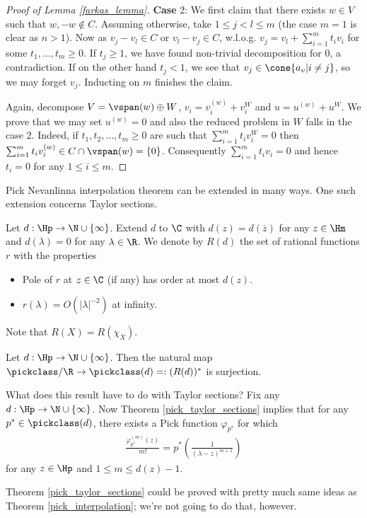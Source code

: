 \begin{proof}[Proof of Lemma \ref{farkas_lemma}]
	\textbf{Case} 2: We first claim that there exists $w \in V$ such that $w, -w \notin C$. Assuming otherwise, take $1 \leq j < l \leq m$ (the case $m = 1$ is clear as $n > 1$). Now as $v_{j} - v_{l} \in C$ or $v_{l} - v_{j} \in C$, w.l.o.g. $v_{j} = v_{l} + \sum_{i = 1}^{m} t_{i} v_{i}$ for some $t_{1}, \ldots, t_{m} \geq 0$. If $t_{j} \geq 1$, we have found non-trivial decomposition for $0$, a contradiction. If on the other hand $t_{j} < 1$, we see that $v_{j} \in \cone\{a_{v} | i \neq j\}$, so we may forget $v_{j}$. Inducting on $m$ finishes the claim.

	Again, decompose $V = \vspan(w) \oplus W$, $v_{i} = v_{i}^{(w)} + v_{i}^{W}$ and $u = u^{(w)} + u^{W}$. We prove that we may set $u^{(w)} = 0$ and also the reduced problem in $W$ falls in the case 2. Indeed, if $t_{1}, t_{2}, \ldots, t_{m} \geq 0$ are such that $\sum_{i = 1}^{m} t_{i} v_{i}^{W} = 0$ then $\sum_{i = 1}^{m} t_{i} v_{i}^{(w)} \in C \cap \vspan(w) = \{0\}$. Consequently $\sum_{i = 1}^{m} t_{i} v_{i} = 0$ and hence $t_{i} = 0$ for any $1 \leq i \leq m$.
\end{proof}

\begin{huom}\label{taylor_section_rem}
	Pick Nevanlinna interpolation theorem can be extended in many ways. One such extension concerns Taylor sections.
	\begin{maar}
		Let $d : \Hp \to \N \cup \{\infty\}$. Extend $d$ to $\C$ with $d(z) = d(\overline{z})$ for any $z \in \Hm$ and $d(\lambda) = 0$ for any $\lambda \in \R$. We denote by $R(d)$ the set of rational functions $r$ with the properties
		\begin{itemize}
			\item Pole of $r$ at $z \in \C$ (if any) has order at most $d(z)$.
			\item $r(\lambda) = O(|\lambda|^{-2})$ at infinity.
		\end{itemize}
	\end{maar}
	Note that $R(X) = R(\chi_{X})$.
	\begin{lause}\label{pick_taylor_sections}
		Let $d : \Hp \to \N \cup \{\infty\}$. Then the natural map $\pickclass/\R \to \pickclass(d) =: (R(d))^{*}$ is surjection.
	\end{lause}
	What does this result have to do with Taylor sections? Fix any $d : \Hp \to \N \cup \{\infty\}$. Now Theorem \ref{pick_taylor_sections} implies that for any $p^{*} \in \pickclass(d)$, there exists a Pick function $\varphi_{p^{*}}$ for which
	\begin{align*}
		\frac{\varphi_{p^{*}}^{(m)}(z)}{m!} = p^{*}\left(\frac{1}{(\lambda - z)^{m + 1}}\right)
	\end{align*}
	for any $z \in \Hp$ and $1 \leq m \leq d(z) - 1$.

	Theorem \ref{pick_taylor_sections} could be proved with pretty much same ideas as Theorem \ref{pick_interpolation}; we're not going to do that, however.
\end{huom}

